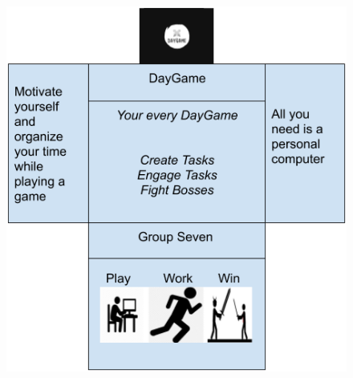 \documentclass[12pt]{report}
\renewcommand{\_}{\kern-1.5pt\textunderscore\kern-1.5pt}
\begin{document}
\begin{figure}[H]	
  	  \includegraphics[width=1.0\textwidth]{./media/image2.png}
~
\end{figure}



\begin{Center}

\end{Center}\par
\end{document}
